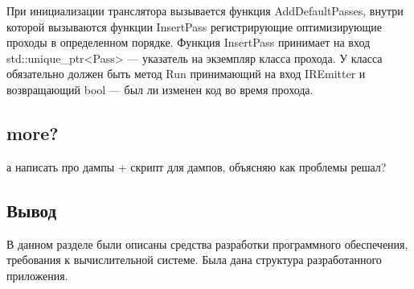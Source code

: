 При инициализации транслятора вызывается функция AddDefaultPasses, внутри которой вызываются функции InsertPass регистрирующие оптимизирующие проходы в определенном порядке. Функция InsertPass принимает на вход std::unique\_ptr<Pass> --- указатель на экземпляр класса прохода. У класса обязательно должен быть метод Run принимающий на вход IREmitter и возвращающий bool --- был ли изменен код во время прохода.

\subsection{more?}

а написать про дампы + скрипт для дампов, объясняю как проблемы решал?

\subsection{Вывод}

В данном разделе были описаны средства разработки программного
обеспечения, требования к вычислительной системе. Была дана структура
разработанного приложения.

\pagebreak